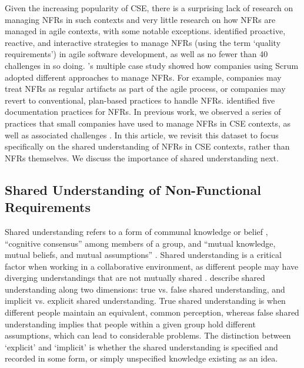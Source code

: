\documentclass[smallextended]{svjour3}       %
\begin{document}
Given the increasing popularity of CSE, there is a surprising lack of research on managing NFRs in such contexts and very little research on how NFRs are managed in agile contexts, with some notable exceptions. \cite{karhapaa2021strategies} identified proactive, reactive, and interactive strategies to manage NFRs (using the term `quality requirements') in agile software development, as well as no fewer than 40 challenges in so doing. 
\cite{rahy2022managing}'s multiple case study showed how companies using Scrum adopted different approaches to manage NFRs. For example, companies may treat NFRs as regular artifacts as part of the agile process, or companies may revert to conventional, plan-based practices to handle NFRs. \cite{nasir2023exploratory} identified five documentation practices for NFRs.
In previous work, we observed a series of practices that small companies have used to manage NFRs in CSE contexts, as well as associated challenges \citep{werner_tse_2021}.  
In this article, we revisit this dataset to focus specifically on the shared understanding of NFRs in CSE contexts, rather than NFRs themselves. We discuss the importance of shared understanding next.



\subsection{Shared Understanding of Non-Functional Requirements}
Shared understanding refers to a form of communal knowledge or belief \citep{glinz_shared_2015}, 
 ``cognitive consensus''
\citep{kleinsmann2010understanding} among members of a group, and ``mutual knowledge, mutual beliefs, and mutual assumptions'' \citep{clark1991grounding}.
Shared understanding is a critical factor when working in a collaborative environment, 
as different people may have diverging understandings that are not mutually shared \citep{bittner2014creating}.
\cite{glinz_shared_2015} describe shared understanding along two dimensions: true vs. false shared understanding, and implicit vs. explicit shared understanding. 
True shared understanding is when different people maintain an equivalent, common perception, whereas false shared understanding implies that people within a given group hold different assumptions, which can lead to considerable problems. 
The distinction between `explicit' and `implicit' is whether the shared understanding is specified and recorded in some form, or simply unspecified knowledge existing as an idea.
\end{document}

